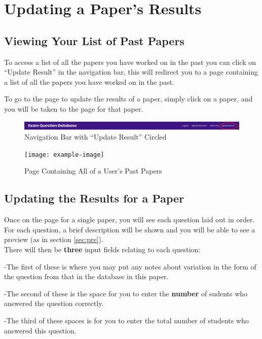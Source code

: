 \documentclass[12pt, a4paper, titlepage]{book}
\begin{document}
\chapter{Updating a Paper's Results}\label{ch:upres}
\section{Viewing Your List of Past Papers}
To access a list of all the papers you have worked on in the past you can click on ``Update Result'' in the navigation bar, this will redirect you to a page containing a list of all the papers you have worked on in the past.\par To go to the page to update the results of a paper, simply click on a paper, and you will be taken to the page for that paper.
\begin{figure}[htp]
\centering
\includegraphics[width =16cm]{NavBarPapRes}
\caption{Navigation Bar with ``Update Result'' Circled}
\end{figure}
\begin{figure}[H]
\centering
\texttt{[image: example-image]}
\caption{Page Containing All of a User's Past Papers}
\end{figure}
\section{Updating the Results for a Paper}
Once on the page for a single paper, you will see each question laid out in order. For each question, a brief description will be shown and you will be able to see a preview (as in section \ref{sec:pre}).
\\There will then be \textbf{three} input fields relating to each question:
\par -The first of these is where you may put any notes about variation in the form of the question from that in the database in this paper.
\par -The second of these is the space for you to enter the \textbf{number} of sudents who answered the question correctly.
\par -The third of these spaces is for you to enter the total number of students who answered this question.
\end{document}
